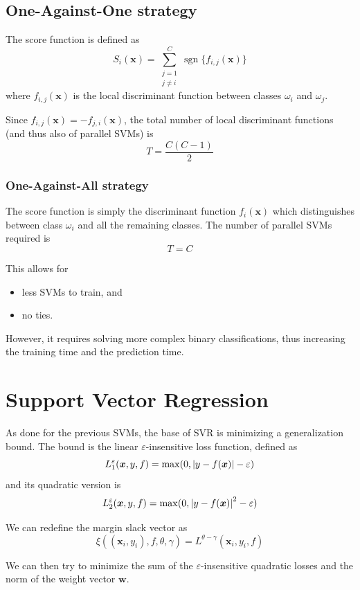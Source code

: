 \documentclass[oneside,onecolumn]{report}
\newcommand{\eps}{\varepsilon}
\DeclareMathOperator*{\sgn}{sgn}
\begin{document}
\subsection{One-Against-One strategy}
The score function is defined as
$$ S_i(\bm x) = \sum_{\substack{j = 1 \\ j \neq i}}^C \sgn\{f_{i, j}(\bm x)\} $$
where $f_{i, j}(\bm x)$ is the local discriminant function between classes $\omega_i$ and $\omega_j$.

Since $f_{i, j}(\bm x) = -f_{j, i}(\bm x)$, the total number of local discriminant functions (and thus also of parallel SVMs) is
$$ T = \frac{C (C - 1)}{2} $$

\subsubsection{One-Against-All strategy}
The score function is simply the discriminant function $f_i(\bm x)$ which distinguishes between class $\omega_i$ and all the remaining classes.
The number of parallel SVMs required is
$$ T = C $$

This allows for
\begin{itemize}
    \item less SVMs to train, and
    \item no ties.
\end{itemize}

However, it requires solving more complex binary classifications, thus increasing the training time and the prediction time.


\section{Support Vector Regression}
As done for the previous SVMs, the base of SVR is minimizing a generalization bound.
The bound is the linear $\eps$-insensitive loss function, defined as
$$ L_1^\eps(\bm x, y, f) = \max(0, \abs{y - f(\bm x)} - \eps) $$
and its quadratic version is
$$ L_2^\eps(\bm x, y, f) = \max(0, \abs{y - f(\bm x)}^2 - \eps) $$

We can redefine the margin slack vector as
$$ \xi((\bm x_i, y_i), f, \theta, \gamma) = L^{\theta - \gamma}(\bm x_i, y_i, f) $$

We can then try to minimize the sum of the $\eps$-insensitive quadratic losses and the norm of the weight vector $\bm w$.
\end{document}
